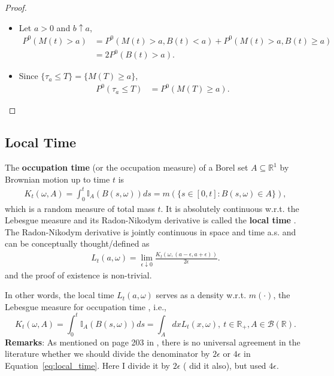 \documentclass{article}
\theoremstyle{plain}
\theoremstyle{definition}
\begin{document}
\begin{proof}
\begin{itemize}
    \item Let $a>0$ and $b\uparrow a$,
    \begin{align*}
        P^0(M(t)>a) &= P^0(M(t)>a,B(t)< a)+P^0(M(t)>a,B(t)\ge a)\\
        &= 2P^0(B(t)>a).
    \end{align*}
    \item Since $\{\tau_a\le T\}=\{M(T)\ge a\}$, 
    \begin{align*}
       P^0(\tau_a\le T) &= P^0(M(T)\ge a).
    \end{align*}
\end{itemize}
\end{proof}

\subsection{Local Time}

The \textbf{occupation time} (or the occupation measure) of a Borel set $A\subseteq \mathbb{R}^1$ by Brownian motion up to time $t$ is
\begin{align*}
    K_t(\omega, A) = \int_0^t\mathbb{I}_A(B(s,\omega))ds = m(\{s\in[0,t] : B(s,\omega)\in A\}),
\end{align*}
which is a random measure of total mass $t$. It is absolutely continuous w.r.t. the Lebesgue measure and its Radon-Nikodym derivative is called the \textbf{local time} \citep{liggett2010continuous}. The Radon-Nikodym derivative is jointly continuous in space and time a.s. and can be conceptually thought/defined as
\begin{align}\label{eq:local_time}
    L_t(a,\omega) = \lim_{\epsilon\downarrow 0}\frac{K_t(\omega, (a-\epsilon,a+\epsilon))}{2\epsilon}.
\end{align}
and the proof of existence is non-trivial.

In other words, the local time $L_t(a,\omega)$ serves as a density w.r.t. $m(\cdot)$, the Lebesgue measure for occupation time \citep{morters2010brownian, karatzas2014brownian}, i.e.,
\[
K_t(\omega, A) = \int_0^t\mathbb{I}_A(B(s,\omega))ds = \int_A dx L_t(x,\omega),\ t\in\mathbb{R}_+,A\in\mathcal{B}(\mathbb{R}).
\]
\textbf{Remarks}: As mentioned on page 203 in \cite{karatzas2014brownian}, there is no universal agreement in the literature whether we should divide the denominator by $2\epsilon$ or $4\epsilon$ in Equation~\ref{eq:local_time}. Here I divide it by $2\epsilon$ (\cite{ccinlar2011probability} did it also), but \cite{karatzas2014brownian,ikeda1984introduction} used $4\epsilon$.
\end{document}
